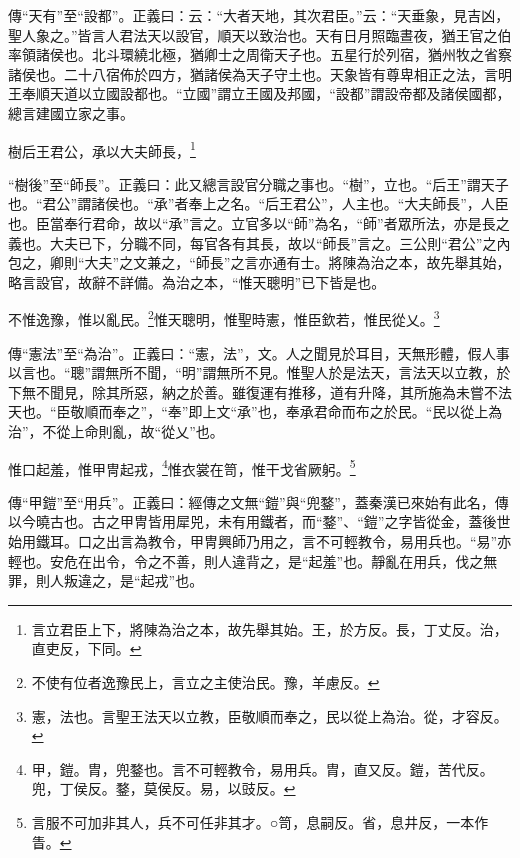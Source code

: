 {\noindent\zhuan{}\fzbyks 傳“天有”至“設都”。正義曰：云：“大者天地，其次君臣。”云：“天垂象，見吉凶，聖人象之。”皆言人君法天以設官，順天以致治也。天有日月照臨晝夜，猶王官之伯率領諸侯也。北斗環繞北極，猶卿士之周衛天子也。五星行於列宿，猶州牧之省察諸侯也。二十八宿佈於四方，猶諸侯為天子守土也。天象皆有尊卑相正之法，言明王奉順天道以立國設都也。“立國”謂立王國及邦國，“設都”謂設帝都及諸侯國都，總言建國立家之事。 \par}

樹后王君公，承以大夫師長，\footnote{言立君臣上下，將陳為治之本，故先舉其始。王，於方反。長，丁丈反。治，直吏反，下同。}

{\noindent\shu{}\fzkt “樹後”至“師長”。正義曰：此又總言設官分職之事也。“樹”，立也。“后王”謂天子也。“君公”謂諸侯也。“承”者奉上之名。“后王君公”，人主也。“大夫師長”，人臣也。臣當奉行君命，故以“承”言之。立官多以“師”為名，“師”者眾所法，亦是長之義也。大夫已下，分職不同，每官各有其長，故以“師長”言之。三公則“君公”之內包之，卿則“大夫”之文兼之，“師長”之言亦通有士。將陳為治之本，故先舉其始，略言設官，故辭不詳備。為治之本，“惟天聰明”已下皆是也。 \par}

不惟逸豫，惟以亂民。\footnote{不使有位者逸豫民上，言立之主使治民。豫，羊慮反。}惟天聰明，惟聖時憲，惟臣欽若，惟民從乂。\footnote{憲，法也。言聖王法天以立教，臣敬順而奉之，民以從上為治。從，才容反。}

{\noindent\zhuan{}\fzbyks 傳“憲法”至“為治”。正義曰：“憲，法”，文。人之聞見於耳目，天無形體，假人事以言也。“聰”謂無所不聞，“明”謂無所不見。惟聖人於是法天，言法天以立教，於下無不聞見，除其所惡，納之於善。雖復運有推移，道有升降，其所施為未嘗不法天也。“臣敬順而奉之”，“奉”即上文“承”也，奉承君命而布之於民。“民以從上為治”，不從上命則亂，故“從乂”也。 \par}

惟口起羞，惟甲冑起戎，\footnote{甲，鎧。胄，兜鍪也。言不可輕教令，易用兵。胄，直又反。鎧，苦代反。兜，丁侯反。鍪，莫侯反。易，以豉反。}惟衣裳在笥，惟干戈省厥躬。\footnote{言服不可加非其人，兵不可任非其才。○笥，息嗣反。省，息井反，一本作眚。}


{\noindent\zhuan{}\fzbyks 傳“甲鎧”至“用兵”。正義曰：經傳之文無“鎧”與“兜鍪”，蓋秦漢已來始有此名，傳以今曉古也。古之甲冑皆用犀兕，未有用鐵者，而“鍪”、“鎧”之字皆從金，蓋後世始用鐵耳。口之出言為教令，甲冑興師乃用之，言不可輕教令，易用兵也。“易”亦輕也。安危在出令，令之不善，則人違背之，是“起羞”也。靜亂在用兵，伐之無罪，則人叛違之，是“起戎”也。 \par}

